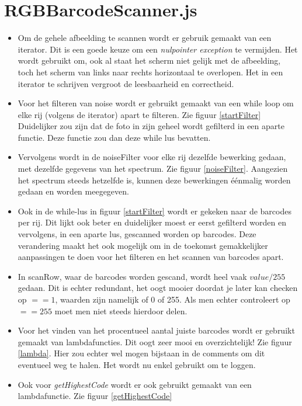 \documentclass[a4paper,11pt]{article}
\begin{document}
\section{RGBBarcodeScanner.js}
\begin{itemize}
	\item Om de gehele afbeelding te scannen wordt er gebruik gemaakt van een iterator. Dit is een goede keuze om een {\it nulpointer exception} te vermijden. Het wordt gebruikt om, ook al staat het scherm niet gelijk met de afbeelding, toch het scherm van links naar rechts horizontaal te overlopen. Het in een iterator te schrijven vergroot de leesbaarheid en correctheid.
	\item Voor het filteren van noise wordt er gebruikt gemaakt van een while loop om elke rij (volgens de iterator) apart te filteren. Zie figuur \ref{startFilter} Duidelijker zou zijn dat de foto in zijn geheel wordt gefilterd in een aparte functie. Deze functie zou dan deze while lus bevatten.
	\item Vervolgens wordt in de noiseFilter voor elke rij dezelfde bewerking gedaan, met dezelfde gegevens van het spectrum. Zie figuur \ref{noiseFilter}. Aangezien het spectrum steeds hetzelfde is, kunnen deze bewerkingen éénmalig worden gedaan en worden meegegeven.
	\item Ook in de while-lus in figuur \ref{startFilter} wordt er gekeken naar de barcodes per rij. Dit lijkt ook beter en duidelijker moest er eerst gefilterd worden en vervolgens, in een aparte lus, gescanned worden op barcodes. Deze verandering maakt het ook mogelijk om in de toekomst gemakkelijker aanpassingen te doen voor het filteren en het scannen van barcodes apart.
	\item In scanRow, waar de barcodes worden gescand, wordt heel vaak $ value/255$ gedaan. Dit is echter redundant, het oogt mooier doordat je later kan checken op $==1$, waarden zijn namelijk of 0 of 255. Als men echter controleert op $==255$ moet men niet steeds hierdoor delen.
	\item Voor het vinden van het procentueel aantal juiste barcodes wordt er gebruikt gemaakt van lambdafuncties. Dit oogt zeer mooi en overzichtelijk! Zie figuur \ref{lambda}. Hier zou echter wel mogen bijstaan in de comments om dit eventueel weg te halen. Het wordt nu enkel gebruikt om te loggen.
	\item Ook voor {\it getHighestCode} wordt er ook gebruikt gemaakt van een lambdafunctie. Zie figuur \ref{getHighestCode}
\end{itemize}
\end{document}
